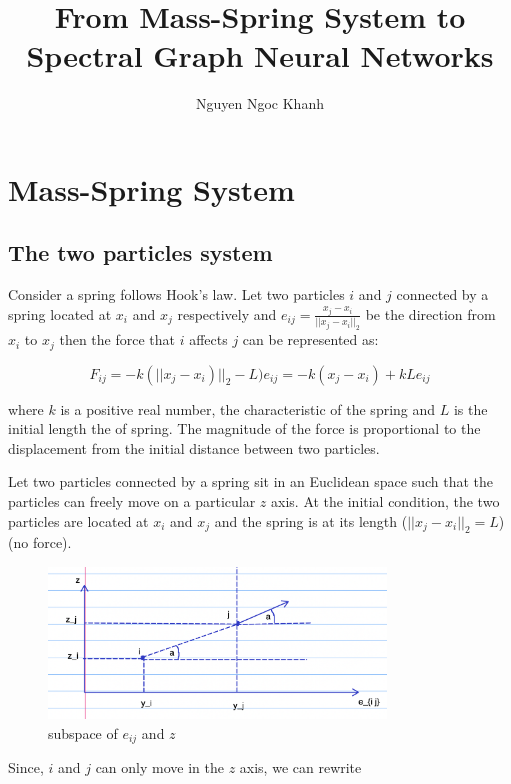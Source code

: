 \documentclass{article}
\title{From Mass-Spring System to Spectral Graph Neural Networks}
\author{Nguyen Ngoc Khanh}
\begin{document}
\maketitle

\section{Mass-Spring System}

\subsection{The two particles system}

Consider a spring follows Hook's law. Let two particles $i$ and $j$ connected by a spring located at $x_i$ and $x_j$ respectively and $e_{i j} = \frac{x_j - x_i}{||x_j - x_i||_2}$ be the direction from $x_i$ to $x_j$ then the force that $i$ affects $j$ can be represented as:

\begin{equation}
    F_{i j} = - k (||x_j - x_i)||_2 - L) e_{i j} = - k (x_j - x_i) + k L e_{i j}
\end{equation}

where $k$ is a positive real number, the characteristic of the spring and $L$ is the initial length the of spring. The magnitude of the force is proportional to the displacement from the initial distance between two particles.

Let two particles connected by a spring sit in an Euclidean space such that the particles can freely move on a particular $z$ axis. At the initial condition, the two particles are located at $x_i$ and $x_j$ and the spring is at its length ($||x_j - x_i||_2 = L$) (no force).

\begin{figure}[h!]
\centering
\includegraphics[width=0.8\textwidth]{fig1.png}
\caption{subspace of $e_{i j}$ and $z$}
\label{fig:fig1}
\end{figure}

Since, $i$ and $j$ can only move in the $z$ axis, we can rewrite 
\end{document}
